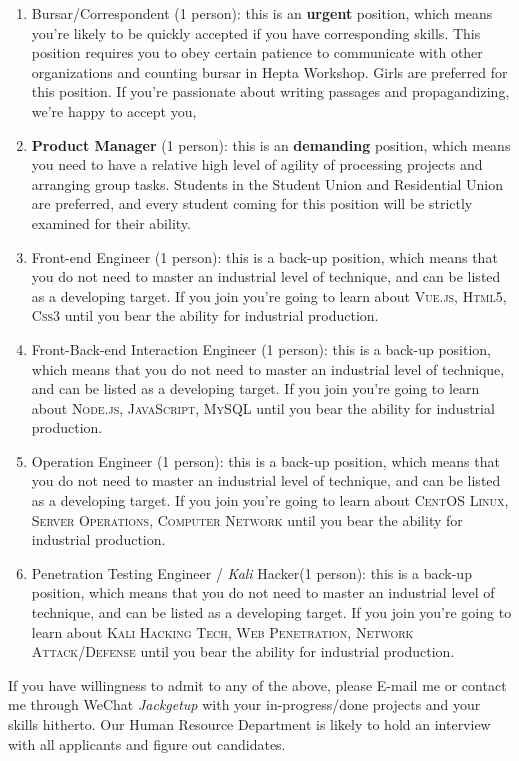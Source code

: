 \documentclass[a4paper,12pt]{texMemo}
\begin{document}
\begin{enumerate}
\newpage



\item Bursar/Correspondent (1 person): this is an \textbf{urgent} position, which means you're likely to be quickly accepted if you have corresponding skills. This position requires you to obey certain patience to communicate with other organizations and counting bursar in Hepta Workshop. Girls are preferred for this position. If you're passionate about writing passages and propagandizing, we're happy to accept you,
\item \textbf{Product Manager} (1 person): this is an \textbf{demanding} position, which means you need to have a relative high level of agility of processing projects and arranging group tasks. Students in the Student Union and Residential Union are preferred, and every student coming for this position will be strictly examined for their ability.
\item Front-end Engineer (1 person): this is a back-up position, which means that you do not need to master an industrial level of technique, and can be listed as a developing target. If you join you're going to learn about \textsc{Vue.js, Html5, Css3} until you bear the ability for industrial production.
\item Front-Back-end Interaction Engineer (1 person): this is a back-up position, which means that you do not need to master an industrial level of technique, and can be listed as a developing target. If you join you're going to learn about \textsc{Node.js, JavaScript, MySQL} until you bear the ability for industrial production.
\item Operation Engineer (1 person): this is a back-up position, which means that you do not need to master an industrial level of technique, and can be listed as a developing target. If you join you're going to learn about \textsc{CentOS Linux, Server Operations, Computer Network} until you bear the ability for industrial production.
\item Penetration Testing Engineer / \textit{Kali} Hacker(1 person): this is a back-up position, which means that you do not need to master an industrial level of technique, and can be listed as a developing target. If you join you're going to learn about \textsc{Kali Hacking Tech, Web Penetration, Network Attack/Defense} until you bear the ability for industrial production.

\end{enumerate}

If you have willingness to admit to any of the above, please E-mail me or contact me through WeChat \textit{Jackgetup} with your in-progress/done projects and your skills hitherto. Our Human Resource Department is likely to hold an interview with all applicants and figure out candidates.

\end{document}
